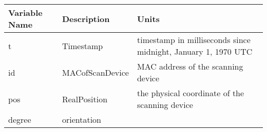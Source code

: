 \documentclass[11pt]{article}
\begin{document}
\begin{longtable}[]{@{}lll@{}}
\toprule
\begin{minipage}[b]{0.05\columnwidth}\raggedright\strut
Variable Name\strut
\end{minipage} & \begin{minipage}[b]{0.12\columnwidth}\raggedright\strut
Description\strut
\end{minipage} & \begin{minipage}[b]{0.74\columnwidth}\raggedright\strut
Units\strut
\end{minipage}\tabularnewline
\midrule
\endhead
\begin{minipage}[t]{0.05\columnwidth}\raggedright\strut
t\strut
\end{minipage} & \begin{minipage}[t]{0.12\columnwidth}\raggedright\strut
Timestamp\strut
\end{minipage} & \begin{minipage}[t]{0.74\columnwidth}\raggedright\strut
timestamp in milliseconds since midnight, January 1, 1970 UTC\strut
\end{minipage}\tabularnewline
\begin{minipage}[t]{0.05\columnwidth}\raggedright\strut
id\strut
\end{minipage} & \begin{minipage}[t]{0.12\columnwidth}\raggedright\strut
MACofScanDevice\strut
\end{minipage} & \begin{minipage}[t]{0.74\columnwidth}\raggedright\strut
MAC address of the scanning device\strut
\end{minipage}\tabularnewline
\begin{minipage}[t]{0.05\columnwidth}\raggedright\strut
pos\strut
\end{minipage} & \begin{minipage}[t]{0.12\columnwidth}\raggedright\strut
RealPosition\strut
\end{minipage} & \begin{minipage}[t]{0.74\columnwidth}\raggedright\strut
the physical coordinate of the scanning device\strut
\end{minipage}\tabularnewline
\begin{minipage}[t]{0.05\columnwidth}\raggedright\strut
degree\strut
\end{minipage} & \begin{minipage}[t]{0.12\columnwidth}\raggedright\strut
orientation\strut
\end{minipage} & \begin{minipage}[t]{0.74\columnwidth}\raggedright\strut

\end{minipage}
\end{longtable}
\end{document}
